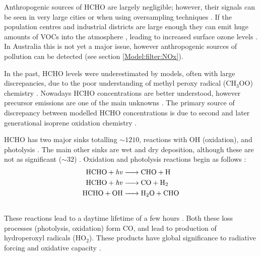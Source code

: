     Anthropogenic sources of HCHO are largely negligible; however, their signals can be seen in very large cities or when using oversampling techniques \parencite{Millet2008,Zhu2014}.
    If the population centres and industrial districts are large enough they can emit huge amounts of VOCs into the atmosphere \parencite{Fu2007}, leading to increased surface ozone levels \parencite{Zhu2014}.
    In Australia this is not yet a major issue, however anthropogenic sources of pollution can be detected (see section \ref{Model:filter:NOx}).
    
    In the past, HCHO levels were underestimated by models, often with large discrepancies, due to the poor understanding of methyl peroxy radical (CH$_3$OO) chemistry \parencite{Wagner2002}.
    Nowadays HCHO concentrations are better understood, however precursor emissions are one of the main unknowns \parencite[eg.][]{Emmerson2016,Marvin2017}.
    The primary source of discrepancy between modelled HCHO concentrations is due to second and later generational isoprene oxidation chemistry \parencite{Marvin2017}.

    HCHO has two major sinks totalling $\sim 1210$\tgpyr, reactions with OH (oxidation), and photolysis \parencite{Levy1972, Crutzen1999, Wagner2002, FortemsCheiney2012, Kefauver2014}.
    The main other sinks are wet and dry deposition, although these are not as significant ($\sim 32$\tgpyr) \parencite{Atkinson2000,FortemsCheiney2012}.
    Oxidation and photolysis reactions begin as follows \parencite{Ayers1997}:
    \begin{align*} %
      \label{Model:GC:Mechanisms:eqn_mechanisms}
        \ce{ 
          HCHO + \mathit{hv} -> & CHO + H \\ 
          HCHO + \mathit{hv} -> & CO + H2 \\ 
          HCHO + OH -> & H2O + CHO \\ 
        }
    \end{align*}
    These reactions lead to a daytime lifetime of a few hours \parencite{Atkinson2000, Millet2006}.
    Both these loss processes (photolysis, oxidation) form CO, and lead to production of hydroperoxyl radicals (HO$_2$).
    These products have global significance to radiative forcing and oxidative capacity \parencite{Franco2015}.
    
